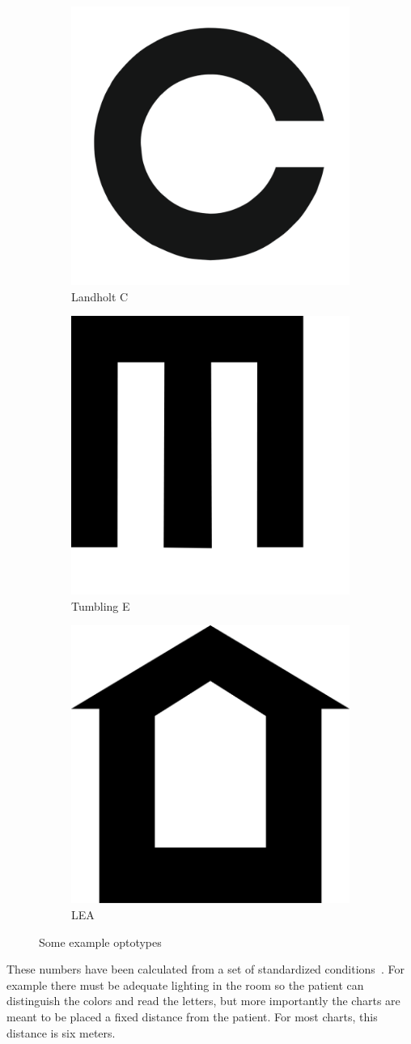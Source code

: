 \documentclass[12pt,a4paper,notitlepage]{report}
\begin{document}
\begin{figure}[ht!]
\centering
\begin{subfigure}{.3\textwidth}
  \centering
  \includegraphics[width=.4\linewidth]{images/landholt_c_optotype.png}
  \caption{Landholt C}
\end{subfigure}%
\begin{subfigure}{.3\textwidth}
  \centering
  \includegraphics[width=.4\linewidth]{images/tumbling_e_optotype.png}
  \caption{Tumbling E}
\end{subfigure}
\begin{subfigure}{.3\textwidth}
  \centering
  \includegraphics[width=.4\linewidth]{images/lea_optotype.png}
  \caption{LEA}
\end{subfigure}
\caption{Some example optotypes}
\label{fig:optotypes_example1}
\end{figure}

These numbers have been calculated from a set of standardized conditions~\cite{Bailey}. For example there must be adequate lighting in the room so the patient can distinguish the colors and read the letters, but more importantly the charts are meant to be placed a fixed distance from the patient. For most charts, this distance is six meters. 
\end{document}
